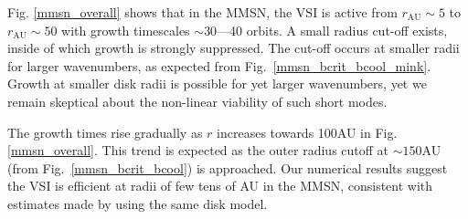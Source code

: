 Fig. \ref{mmsn_overall} shows that in the MMSN, the VSI  is active
from $r_\mathrm{AU}\sim 5$ to $r_\mathrm{AU}\sim 
50$ with growth timescales $\sim 30$---40 orbits.  A small radius
cut-off exists, inside of which growth is strongly suppressed.  The 
cut-off occurs at smaller radii for larger wavenumbers, as expected
from Fig.\ \ref{mmsn_bcrit_bcool_mink}.  Growth at smaller disk radii
is possible for yet larger wavenumbers, yet we remain skeptical about
the non-linear viability of such short modes. 

The growth times rise gradually as $r$ increases towards 100AU in
Fig. \ref{mmsn_overall}.  This trend is expected as the outer radius
cutoff at $\sim 150$AU (from Fig.\ \ref{mmsn_bcrit_bcool}) is
approached. Our numerical results suggest the VSI is efficient at
radii of few tens of AU in the MMSN, consistent with estimates made by
 using the same disk model.   

%





